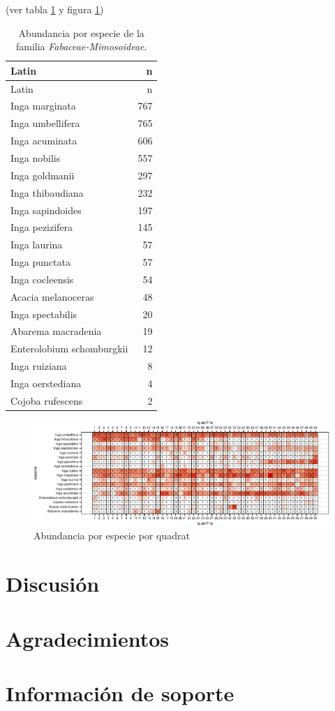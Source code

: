 \documentclass[11pt,]{article}
\begin{document}
(ver tabla \ref{tab:abun_sp} y figura \ref{fig:abun_sp_q})

\begin{longtable}[]{@{}lr@{}}
\caption{\label{tab:abun_sp}Abundancia por especie de la familia
\emph{Fabaceae-Mimosoideae}.}\tabularnewline
\toprule
Latin & n\tabularnewline
\midrule
\endfirsthead
\toprule
Latin & n\tabularnewline
\midrule
\endhead
Inga marginata & 767\tabularnewline
Inga umbellifera & 765\tabularnewline
Inga acuminata & 606\tabularnewline
Inga nobilis & 557\tabularnewline
Inga goldmanii & 297\tabularnewline
Inga thibaudiana & 232\tabularnewline
Inga sapindoides & 197\tabularnewline
Inga pezizifera & 145\tabularnewline
Inga laurina & 57\tabularnewline
Inga punctata & 57\tabularnewline
Inga cocleensis & 54\tabularnewline
Acacia melanoceras & 48\tabularnewline
Inga spectabilis & 20\tabularnewline
Abarema macradenia & 19\tabularnewline
Enterolobium schomburgkii & 12\tabularnewline
Inga ruiziana & 8\tabularnewline
Inga oerstediana & 4\tabularnewline
Cojoba rufescens & 2\tabularnewline
\bottomrule
\end{longtable}

\begin{figure}
\centering
\includegraphics{manuscrito_files/figure-latex/unnamed-chunk-3-1.pdf}
\caption{\label{fig:abun_sp_q}Abundancia por especie por quadrat}
\end{figure}

\section{Discusión}\label{discusiuxf3n}

\section{Agradecimientos}\label{agradecimientos}

\section{Información de soporte}\label{informaciuxf3n-de-soporte}
\end{document}
